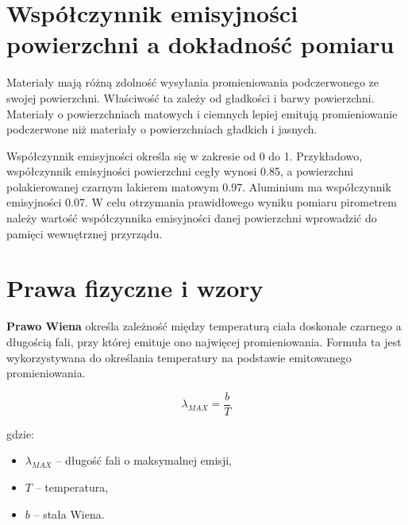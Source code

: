 \section*{Współczynnik emisyjności powierzchni a dokładność pomiaru}

Materiały mają różną zdolność wysyłania promieniowania podczerwonego ze swojej powierzchni. Właściwość ta zależy od gładkości i barwy powierzchni. Materiały o powierzchniach matowych i ciemnych lepiej emitują promieniowanie podczerwone niż materiały o powierzchniach gładkich i jasnych.

\vspace{12pt}

Współczynnik emisyjności określa się w zakresie od 0 do 1. Przykładowo, współczynnik emisyjności powierzchni cegły wynosi 0.85, a powierzchni polakierowanej czarnym lakierem matowym 0.97. Aluminium ma współczynnik emisyjności 0.07. W celu otrzymania prawidłowego wyniku pomiaru pirometrem należy wartość współczynnika emisyjności danej powierzchni wprowadzić do pamięci wewnętrznej przyrządu.






\section*{Prawa fizyczne i wzory}

\textbf{Prawo Wiena} określa zależność między temperaturą ciała doskonale czarnego a długością fali, przy której emituje ono najwięcej promieniowania. Formuła ta jest wykorzystywana do określania temperatury na podstawie emitowanego promieniowania.

\begin{equation}
    \lambda_{MAX} = \frac{b}{T}
\end{equation}

gdzie:
\begin{itemize}
    \item $\lambda_{MAX}$ – długość fali o maksymalnej emisji,
    \item $T$ – temperatura,
    \item $b$ – stała Wiena.
\end{itemize}

